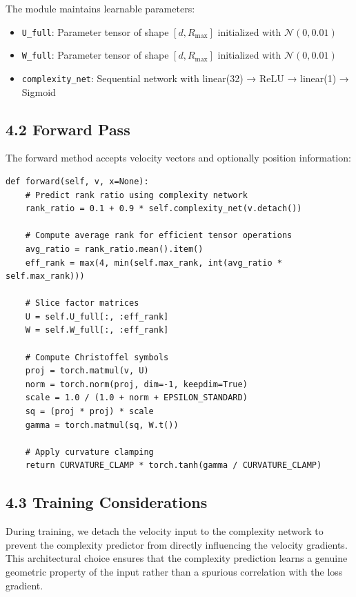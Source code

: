 \documentclass[12pt]{article}
\begin{document}
The module maintains learnable parameters:
\begin{itemize}
\item \texttt{U\_full}: Parameter tensor of shape $[d, R_{\max}]$ initialized with $\mathcal{N}(0, 0.01)$
\item \texttt{W\_full}: Parameter tensor of shape $[d, R_{\max}]$ initialized with $\mathcal{N}(0, 0.01)$
\item \texttt{complexity\_net}: Sequential network with linear(32) → ReLU → linear(1) → Sigmoid
\end{itemize}

\subsection{4.2 Forward Pass}

The forward method accepts velocity vectors and optionally position information:

\begin{lstlisting}[style=pystyle]
def forward(self, v, x=None):
    # Predict rank ratio using complexity network
    rank_ratio = 0.1 + 0.9 * self.complexity_net(v.detach())
    
    # Compute average rank for efficient tensor operations
    avg_ratio = rank_ratio.mean().item()
    eff_rank = max(4, min(self.max_rank, int(avg_ratio * self.max_rank)))
    
    # Slice factor matrices
    U = self.U_full[:, :eff_rank]
    W = self.W_full[:, :eff_rank]
    
    # Compute Christoffel symbols
    proj = torch.matmul(v, U)
    norm = torch.norm(proj, dim=-1, keepdim=True)
    scale = 1.0 / (1.0 + norm + EPSILON_STANDARD)
    sq = (proj * proj) * scale
    gamma = torch.matmul(sq, W.t())
    
    # Apply curvature clamping
    return CURVATURE_CLAMP * torch.tanh(gamma / CURVATURE_CLAMP)
\end{lstlisting}

\subsection{4.3 Training Considerations}

During training, we detach the velocity input to the complexity network to prevent the complexity predictor from directly influencing the velocity gradients. This architectural choice ensures that the complexity prediction learns a genuine geometric property of the input rather than a spurious correlation with the loss gradient.
\end{document}
